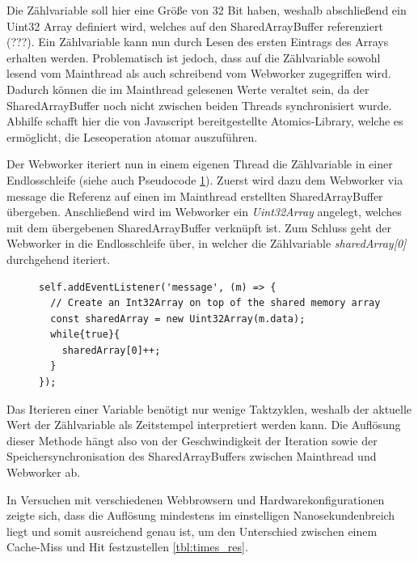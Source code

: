 Die Zählvariable soll hier eine Größe von 32 Bit haben, weshalb abschließend ein Uint32 Array definiert wird, welches auf den SharedArrayBuffer referenziert (???). 
Ein Zählvariable kann nun durch Lesen des ersten Eintrags des Arrays erhalten werden. 
Problematisch ist jedoch, dass auf die Zählvariable sowohl lesend vom Mainthread als auch schreibend vom Webworker zugegriffen wird. 
Dadurch können die im Mainthread gelesenen Werte veraltet sein, da der SharedArrayBuffer noch nicht zwischen beiden Threads synchronisiert wurde. 
Abhilfe schafft hier die von Javascript bereitgestellte Atomics-Library, welche es ermöglicht, die Leseoperation atomar auszuführen.

Der Webworker iteriert nun in einem eigenen Thread die Zählvariable in einer Endlosschleife (siehe auch Pseudocode \ref{alg_list:sharedArrayBufferWorker}). 
Zuerst wird dazu dem Webworker via message die Referenz auf einen im Mainthread erstellten SharedArrayBuffer übergeben.
Anschließend wird im Webworker ein \textit{Uint32Array} angelegt, welches mit dem übergebenen SharedArrayBuffer verknüpft ist. 
Zum Schluss geht der Webworker in die Endlosschleife über, in welcher die Zählvariable \textit{sharedArray[0]} durchgehend iteriert.

\begin{figure}[h]
\label{alg_list:sharedArrayBufferWorker}
\begin{lstlisting}[caption=counterWebworker.js: Webworker welcher die Zählvariable in einer Endlosschleife iteriert]
self.addEventListener('message', (m) => {
  // Create an Int32Array on top of the shared memory array 
  const sharedArray = new Uint32Array(m.data);
  while{true}{
    sharedArray[0]++;
  }
});
\end{lstlisting}
\end{figure}

Das Iterieren einer Variable benötigt nur wenige Taktzyklen, weshalb der aktuelle Wert der Zählvariable als Zeitstempel interpretiert werden kann. 
Die Auflösung dieser Methode hängt also von der Geschwindigkeit der Iteration sowie der Speichersynchronisation des SharedArrayBuffers zwischen Mainthread und Webworker ab.

In Versuchen mit verschiedenen Webbrowsern und Hardwarekonfigurationen zeigte sich, dass die Auflösung mindestens im einstelligen Nanosekundenbreich liegt und somit ausreichend genau ist, um den Unterschied zwischen einem Cache-Miss und Hit festzustellen \ref{tbl:times_res}.

